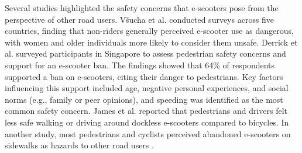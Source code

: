 Several studies highlighted the safety concerns that e-scooters pose from the perspective of other road users. Všucha et al. \cite{vsucha2023scooter} conducted surveys across five countries, finding that non-riders generally perceived e-scooter use as dangerous, with women and older individuals more likely to consider them unsafe.
Derrick et al. \cite{derrick2020perceptions} surveyed participants in Singapore to assess pedestrian safety concerns and support for an e-scooter ban. The findings showed that 64\% of respondents supported a ban on e-scooters, citing their danger to pedestrians. Key factors influencing this support included age, negative personal experiences, and social norms (e.g., family or peer opinions), and speeding was identified as the most common safety concern.
James et al. \cite{james2023pedestrians} reported that pedestrians and drivers felt less safe walking or driving around dockless e-scooters compared to bicycles. In another study, most pedestrians and cyclists perceived abandoned e-scooters on sidewalks as hazards to other road users \cite{burt2023scooter}.


